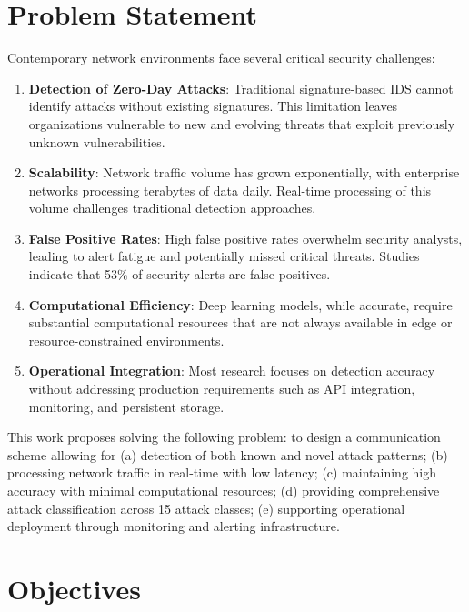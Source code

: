 \documentclass[12pt,a4paper]{report}
\begin{document}
\section{Problem Statement}

Contemporary network environments face several critical security challenges:

\begin{enumerate}
    \item \textbf{Detection of Zero-Day Attacks}: Traditional signature-based IDS cannot identify attacks without existing signatures. This limitation leaves organizations vulnerable to new and evolving threats that exploit previously unknown vulnerabilities.

    \item \textbf{Scalability}: Network traffic volume has grown exponentially, with enterprise networks processing terabytes of data daily. Real-time processing of this volume challenges traditional detection approaches.

    \item \textbf{False Positive Rates}: High false positive rates overwhelm security analysts, leading to alert fatigue and potentially missed critical threats. Studies indicate that 53\% of security alerts are false positives.

    \item \textbf{Computational Efficiency}: Deep learning models, while accurate, require substantial computational resources that are not always available in edge or resource-constrained environments.

    \item \textbf{Operational Integration}: Most research focuses on detection accuracy without addressing production requirements such as API integration, monitoring, and persistent storage.
\end{enumerate}

This work proposes solving the following problem: to design a communication scheme allowing for (a) detection of both known and novel attack patterns; (b) processing network traffic in real-time with low latency; (c) maintaining high accuracy with minimal computational resources; (d) providing comprehensive attack classification across 15 attack classes; (e) supporting operational deployment through monitoring and alerting infrastructure.

\section{Objectives}
\end{document}
